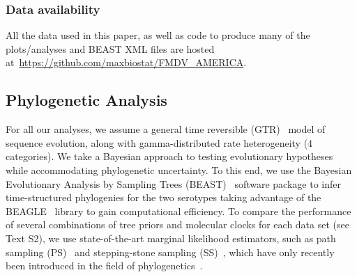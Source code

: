 \documentclass[10pt]{article}
\begin{document}
\subsubsection*{Data availability}
All the data used in this paper, as well as code to produce many of the plots/analyses and BEAST XML files are hosted at~\url{https://github.com/maxbiostat/FMDV_AMERICA}.

\subsection*{Phylogenetic Analysis}

For all our analyses, we assume a general time reversible (GTR)~\citep{Tavare1986} model of sequence evolution, along with gamma-distributed rate heterogeneity (4 categories).
We take a Bayesian approach to testing evolutionary hypotheses while accommodating phylogenetic uncertainty. 
To this end, we use the Bayesian Evolutionary Analysis by Sampling Trees (BEAST)~\citep{Drummond2012} software package to infer time-structured phylogenies for the two serotypes taking advantage of the BEAGLE~\citep{Ayres2012} library to gain computational efficiency.
To compare the performance of several combinations of tree priors and molecular clocks for each data set (see Text S2), we use state-of-the-art marginal likelihood estimators, such as path sampling (PS)~\citep{Lartillot2006} and stepping-stone sampling (SS)~\citep{Xie2011}, which have only recently been introduced in the field of phylogenetics~\citep{Lartillot2006, Xie2011, Baele2012, Baele2013a, Baele2013b, Baele2013c}.
% 
% 
\end{document}
